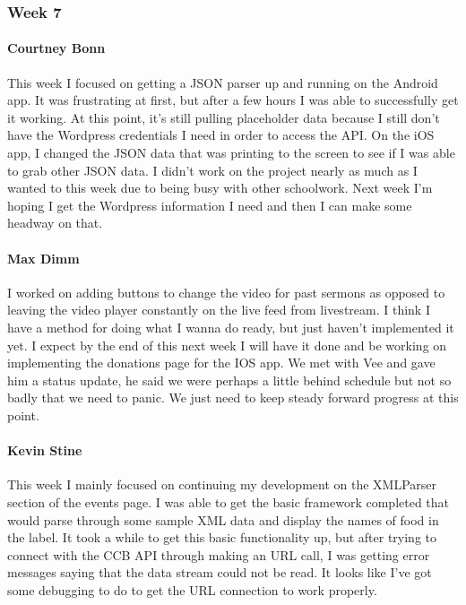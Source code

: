 		\subsubsection{Week 7}

			\paragraph{Courtney Bonn}
			This week I focused on getting a JSON parser up and running on the Android app. It was frustrating at first, but after a few hours I was able to successfully get it working. At this point, it's still pulling placeholder data because I still don't have the Wordpress credentials I need in order to access the API. On the iOS app, I changed the JSON data that was printing to the screen to see if I was able to grab other JSON data. I didn't work on the project nearly as much as I wanted to this week due to being busy with other schoolwork. Next week I'm hoping I get the Wordpress information I need and then I can make some headway on that.

			\paragraph{Max Dimm}
			I worked on adding buttons to change the video for past sermons as opposed to leaving the video player constantly on the live feed from livestream. I think I have a method for doing what I wanna do ready, but just haven't implemented it yet. I expect by the end of this next week I will have it done and be working on implementing the donations page for the IOS app. We met with Vee and gave him a status update, he said we were perhaps a little behind schedule but not so badly that we need to panic. We just need to keep steady forward progress at this point.

			\paragraph{Kevin Stine}
			This week I mainly focused on continuing my development on the XMLParser section of the events page. I was able to get the basic framework completed that would parse through some sample XML data and display the names of food in the label. It took a while to get this basic functionality up, but after trying to connect with the CCB API through making an URL call, I was getting error messages saying that the data stream could not be read. It looks like I've got some debugging to do to get the URL connection to work properly.

